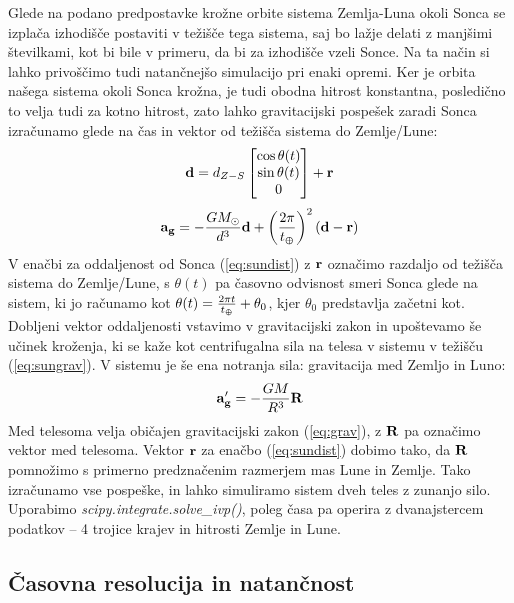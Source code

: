 \documentclass{article}
\begin{document}
Glede na podano predpostavke krožne orbite sistema Zemlja-Luna okoli Sonca se izplača izhodišče postaviti v težišče tega sistema, saj bo lažje delati z manjšimi številkami, kot bi bile v primeru, da bi za izhodišče vzeli Sonce. Na ta način si lahko privoščimo tudi natančnejšo simulacijo pri enaki opremi. Ker je orbita našega sistema okoli Sonca krožna, je tudi obodna hitrost konstantna, posledično to velja tudi za kotno hitrost, zato lahko gravitacijski pospešek zaradi Sonca izračunamo glede na čas in vektor od težišča sistema do Zemlje/Lune:
\begin{equation}
    {\bf d}=d_{Z-S}\begin{bmatrix}\cos{\theta(t)}\\\sin{\theta(t)}\\0\end{bmatrix} + \bf r
    \label{eq:sundist}
\end{equation}
\begin{equation}
    {\bf a_g}=-\frac{GM_\odot}{d^3}{\bf d} + \left(\frac{2\pi}{t_\varoplus}\right)^2({\bf d}-{\bf r})
    \label{eq:sungrav}
\end{equation}
V enačbi za oddaljenost od Sonca (\ref{eq:sundist}) z $\bf r$ označimo razdaljo od težišča sistema do Zemlje/Lune, s $\theta(t)$ pa časovno odvisnost smeri Sonca glede na sistem, ki jo računamo kot $\theta(t)=\frac{2\pi t}{t_\varoplus} + \theta_0$, kjer $\theta_0$ predstavlja začetni kot. Dobljeni vektor oddaljenosti vstavimo v gravitacijski zakon in upoštevamo še učinek kroženja, ki se kaže kot centrifugalna sila na telesa v sistemu v težišču (\ref{eq:sungrav}).
V sistemu je še ena notranja sila: gravitacija med Zemljo in Luno:
\begin{equation} \label{eq:grav}
    {\bf a_g'}=-\frac{GM}{R^3}{\bf R}
\end{equation}
Med telesoma velja običajen gravitacijski zakon (\ref{eq:grav}), z $\bf R$ pa označimo vektor med telesoma. Vektor $\bf r$ za enačbo (\ref{eq:sundist}) dobimo tako, da $\bf R$ pomnožimo s primerno predznačenim razmerjem mas Lune in Zemlje. 
Tako izračunamo vse pospeške, in lahko simuliramo sistem dveh teles z zunanjo silo. Uporabimo \textit{scipy.integrate.solve\_ivp()}, poleg časa pa operira z dvanajstercem podatkov -- 4 trojice krajev in hitrosti Zemlje in Lune.

\subsection{Časovna resolucija in natančnost}
\end{document}
